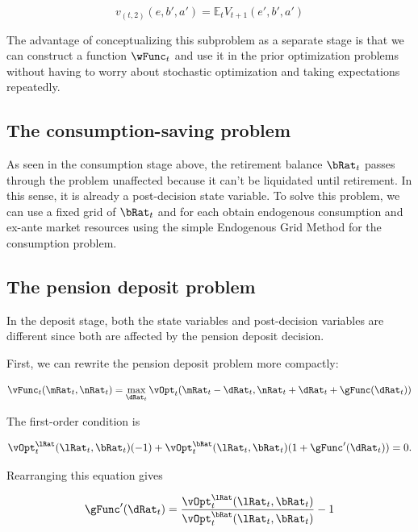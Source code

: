\documentclass{article}
\begin{document}
\begin{equation}
v_{(t,2)}(e, b', a') = \mathbb{E}_t V_{t+1}(e', b', a')
\end{equation}

The advantage of conceptualizing this subproblem as a separate stage is that we can construct a function $\wFunc_{t}$ and use it in the prior optimization problems without having to worry about stochastic optimization and taking expectations repeatedly.

\subsection{The consumption-saving problem}

As seen in the consumption stage above, the retirement balance $\bRat_{t}$ passes through the problem unaffected because it can't be liquidated until retirement. In this sense, it is already a post-decision state variable. To solve this problem, we can use a fixed grid of $\bRat_{t}$ and for each obtain endogenous consumption and ex-ante market resources using the simple Endogenous Grid Method for the consumption problem.

\subsection{The pension deposit problem}

In the deposit stage, both the state variables and post-decision variables are different since both are affected by the pension deposit decision.

First, we can rewrite the pension deposit problem more compactly:

\begin{equation}
\vFunc_{t}(\mRat_{t}, \nRat_{t}) = \max_{\dRat_{t}}
    \vOpt_{t}(\mRat_{t} - \dRat_{t}, \nRat_{t} + \dRat_{t} + \gFunc(\dRat_{t}))
\end{equation}

The first-order condition is

\begin{equation}
\vOpt_{t}^{\lRat}(\lRat_{t}, \bRat_{t})(-1) +
    \vOpt_{t}^{\bRat}(\lRat_{t}, \bRat_{t})(1+\gFunc'(\dRat_{t})) = 0.
\end{equation}

Rearranging this equation gives

\begin{equation}
\gFunc'(\dRat_{t}) = \frac{\vOpt_{t}^{\lRat}(\lRat_{t},
        \bRat_{t})}{\vOpt_{t}^{\bRat}(\lRat_{t}, \bRat_{t})} - 1
\end{equation}
\end{document}
